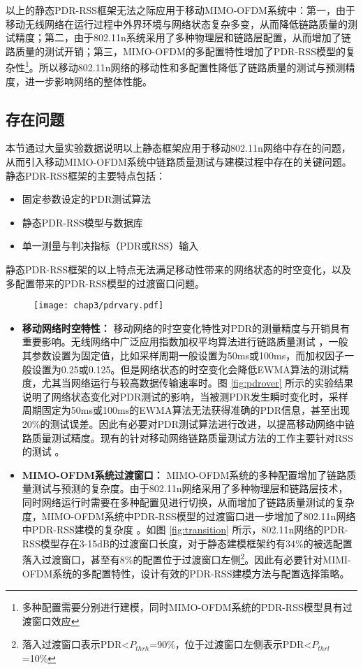 以上的静态PDR-RSS框架无法之际应用于移动MIMO-OFDM系统中：第一，由于移动无线网络在运行过程中外界环境与网络状态复杂多变，从而降低链路质量的测试精度；第二，由于802.11n系统采用了多种物理层和链路层配置，从而增加了链路质量的测试开销；第三，MIMO-OFDM的多配置特性增加了PDR-RSS模型的复杂性\footnote{多种配置需要分别进行建模，同时MIMO-OFDM系统的PDR-RSS模型具有过渡窗口效应}。所以移动802.11n网络的移动性和多配置性降低了链路质量的测试与预测精度，进一步影响网络的整体性能。

\subsection{存在问题}
\label{sec:prob3}

本节通过大量实验数据说明以上静态框架应用于移动802.11n网络中存在的问题，从而引入移动MIMO-OFDM系统中链路质量测试与建模过程中存在的关键问题。静态PDR-RSS框架的主要特点包括：
\begin{itemize}
  \item 固定参数设定的PDR测试算法
  \item 静态PDR-RSS模型与数据库
  \item 单一测量与判决指标（PDR或RSS）输入
\end{itemize}
静态PDR-RSS框架的以上特点无法满足移动性带来的网络状态的时空变化，以及多配置带来的PDR-RSS模型的过渡窗口问题。

\begin{figure}[!htp]
\centering
    \texttt{[image: chap3/pdrvary.pdf]}
\end{figure}

\begin{itemize}
  \item \textbf{移动网络时空特性：}
  移动网络的时空变化特性对PDR的测量精度与开销具有重要影响。无线网络中广泛应用指数加权平均算法进行链路质量测试 \cite{ath9k} \cite{minstrel} \cite{wong2008wireless}，一般其参数设置为固定值，比如采样周期一般设置为50ms或100ms，而加权因子一般设置为0.25或0.125。但是网络状态的时空变化会降低EWMA算法的测试精度，尤其当网络运行与较高数据传输速率时。图 \ref{fig:pdrover} 所示的实验结果说明了网络状态变化对PDR测试的影响，当被测PDR发生瞬时变化时，采样周期固定为50ms或100ms的EWMA算法无法获得准确的PDR信息，甚至出现20\%的测试误差。因此有必要对PDR测试算法进行改进，以提高移动网络中链路质量测试精度。现有的针对移动网络链路质量测试方法的工作主要针对RSS的测试 \cite{chen2011ram} \cite{judd2008efficient}。
  \item \textbf{MIMO-OFDM系统过渡窗口：}
  MIMO-OFDM系统的多种配置增加了链路质量测试与预测的复杂度。由于802.11n网络采用了多种物理层和链路层技术，同时网络运行时需要在多种配置见进行切换，从而增加了链路质量测试的复杂度，MIMO-OFDM系统中PDR-RSS模型的过渡窗口进一步增加了802.11n网络中PDR-RSS建模的复杂度 \cite{Halperin2010predictable}。如图 \ref{fig:transition} 所示，802.11n网络的PDR-RSS模型存在3-15dB的过渡窗口长度，对于静态建模框架约有34\%的被选配置落入过渡窗口，甚至有8\%的配置位于过渡窗口左侧\footnote{落入过渡窗口表示PDR<$P_{thrh}$=90\%，位于过渡窗口左侧表示PDR<$P_{thrl}$=10\%}。因此有必要针对MIMI-OFDM系统的多配置特性，设计有效的PDR-RSS建模方法与配置选择策略。
\end{itemize}

